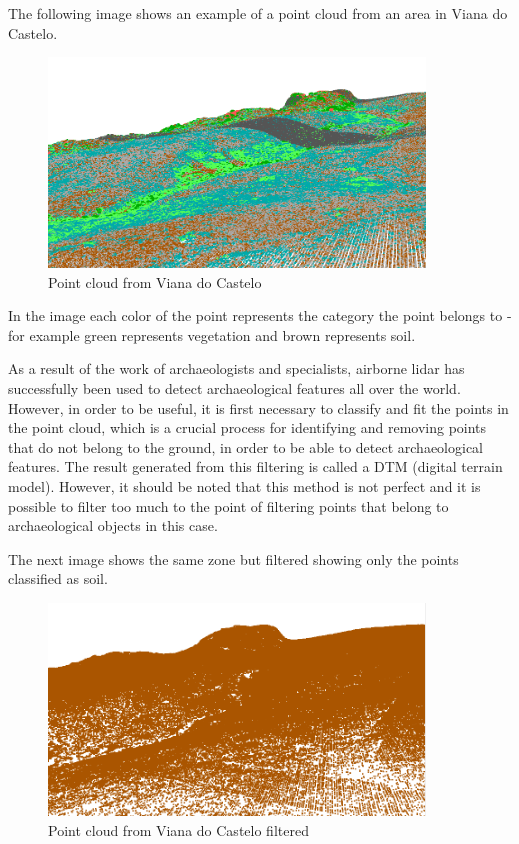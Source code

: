 The following image shows an example of a point cloud from an area in Viana do Castelo.

\begin{figure}[H]
\centering
\includegraphics[width=10cm]{images/pointcloudViana.png}
\caption{Point cloud from Viana do Castelo}
\end{figure}

In the image each color of the point represents the category the point belongs to - for example green represents vegetation and brown represents soil.

As a result of the work of archaeologists and specialists, airborne lidar has successfully been used to detect archaeological features all over the world. However, in order to be useful, it is first necessary to classify and fit the points in the point cloud, which is a crucial process for identifying and removing points that do not belong to the ground, in order to be able to detect archaeological features. The result generated from this filtering is called a DTM (digital terrain model). However, it should be noted that this method is not perfect and it is possible to filter too much to the point of filtering points that belong to archaeological objects in this case.

The next image shows the same zone but filtered showing only the points classified as soil.
\begin{figure}[H]
\centering
\includegraphics[width=10cm]{images/pointcloudVianafiltrado.png}
\caption{Point cloud from Viana do Castelo filtered}
\end{figure}

